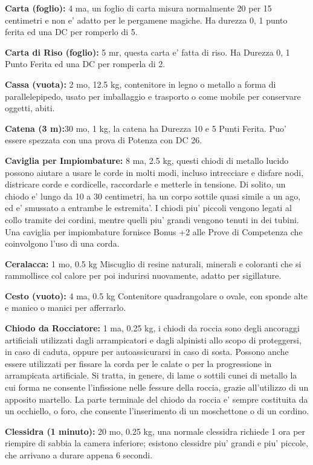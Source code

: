 \documentclass[a4paper,11pt,twoside,openany]{dndbook}
\begin{document}
{\textbf{Carta (foglio):} 4 ma, un foglio di carta misura normalmente 20 per 15 centimetri e non e' adatto per le pergamene magiche. Ha durezza 0, 1 punto ferita ed una DC per romperlo di 5.

\textbf{Carta di Riso (foglio):} 5 mr, questa carta e' fatta di riso. Ha Durezza 0, 1 Punto Ferita ed una DC per romperla di 2.

\textbf{Cassa (vuota):} 2 mo, 12.5 kg, contenitore in legno o metallo a forma di parallelepipedo, usato per imballaggio e trasporto o come mobile per conservare oggetti, abiti. 

\textbf{Catena (3 m):}30 mo, 1 kg, la catena ha Durezza 10 e 5 Punti Ferita. Puo' essere spezzata con
una prova di Potenza con DC 26.

\textbf{Caviglia per Impiombature:} 8 ma, 2.5 kg, questi chiodi di metallo lucido possono aiutare a usare le corde in molti modi, incluso intrecciare e disfare nodi, districare corde e cordicelle, raccordarle e metterle in tensione. Di solito, un chiodo e' lungo da 10 a 30 centimetri, ha un corpo sottile quasi simile a un ago, ed e' smussato a entrambe le estremita'. I chiodi piu' piccoli vengono legati al collo tramite dei cordini, mentre quelli piu' grandi vengono tenuti in dei tubini. Una caviglia per impiombature fornisce Bonus +2 alle Prove di Competenza che coinvolgono l'uso di una corda. 

\textbf{Ceralacca:} 1 mo, 0.5 kg Miscuglio di resine naturali, minerali e coloranti che si rammollisce col calore per poi indurirsi nuovamente, adatto per sigillature.

\textbf{Cesto (vuoto):} 4 ma, 0.5 kg Contenitore quadrangolare o ovale, con sponde alte e manico o manici per afferrarlo.

\textbf{Chiodo da Rocciatore:} 1 ma, 0.25 kg, i chiodi da roccia sono degli ancoraggi artificiali utilizzati dagli arrampicatori e dagli alpinisti allo scopo di proteggersi, in caso di caduta, oppure per autoassicurarsi in caso di sosta. Possono anche essere utilizzati per fissare la corda per le calate o per la progressione in arrampicata artificiale. Si tratta, in genere, di lame o sottili cunei di metallo la cui forma ne consente l'infissione nelle fessure della roccia, grazie all'utilizzo di un apposito martello. La parte terminale del chiodo da roccia e' sempre costituita da un occhiello, o foro, che consente l'inserimento di un moschettone o di un cordino.

\textbf{Clessidra (1 minuto):} 20 mo, 0.25 kg, una normale clessidra richiede 1 ora per riempire di sabbia la camera inferiore; esistono clessidre piu' grandi e piu' piccole, che arrivano a durare appena 6
secondi.

}
\end{document}
